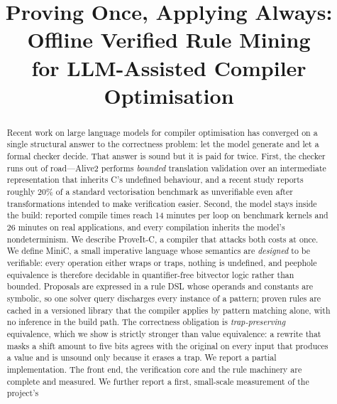 \documentclass[conference]{IEEEtran}
\begin{document}
\title{Proving Once, Applying Always: Offline Verified Rule Mining\\for
LLM-Assisted Compiler Optimisation}

\author{
}

\maketitle

\begin{abstract}
Recent work on large language models for compiler optimisation has converged on
a single structural answer to the correctness problem: let the model generate
and let a formal checker decide. That answer is sound but it is paid for twice.
First, the checker runs out of road---Alive2 performs \emph{bounded}
translation validation over an intermediate representation that inherits C's
undefined behaviour, and a recent study reports roughly 20\% of a standard
vectorisation benchmark as unverifiable even after transformations intended to
make verification easier. Second, the model stays inside the build: reported
compile times reach 14 minutes per loop on benchmark kernels and 26 minutes on
real applications, and every compilation inherits the model's nondeterminism.
We describe ProveIt-C, a compiler that attacks both costs at once. We define
MiniC, a small imperative language whose semantics are \emph{designed} to be
verifiable: every operation either wraps or traps, nothing is undefined, and
peephole equivalence is therefore decidable in quantifier-free bitvector logic
rather than bounded. Proposals are expressed in a rule DSL whose operands and
constants are symbolic, so one solver query discharges every instance of a
pattern; proven rules are cached in a versioned library that the compiler
applies by pattern matching alone, with no inference in the build path. The
correctness obligation is \emph{trap-preserving} equivalence, which we show is
strictly stronger than value equivalence: a rewrite that masks a shift amount
to five bits agrees with the original on every input that produces a value and
is unsound only because it erases a trap. We report a partial implementation.
The front end, the verification core and the rule machinery are complete and
measured. We further report a first, small-scale measurement of the project's

\end{abstract}
\end{document}
